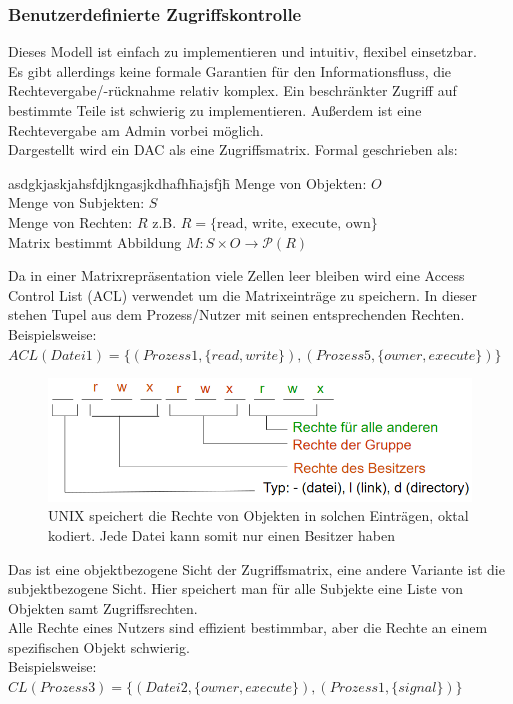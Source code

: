 \documentclass[a4paper,12pt,leqno]{article}
\begin{document}
\subsubsection{Benutzerdefinierte Zugriffskontrolle}
Dieses Modell ist einfach zu implementieren und intuitiv, flexibel einsetzbar.\\
Es gibt allerdings keine formale Garantien für den Informationsfluss, die Rechtevergabe/-rücknahme relativ komplex. Ein beschränkter Zugriff auf bestimmte Teile ist schwierig zu implementieren. Außerdem ist eine Rechtevergabe am Admin vorbei möglich.\\

Dargestellt wird ein DAC als eine Zugriffsmatrix. Formal geschrieben als:
\begin{tabbing}
asdgkjaskjahsfdjkngasjkdhafh\= hajsfjh\=\kill
Menge von Objekten: \> \>   $O$\\
Menge von Subjekten: \>   \>    $S$\\
Menge von Rechten: \>\>$R$ z.B. $R = \{\textrm{read, write, execute, own}\}$\\
Matrix bestimmt Abbildung \>\> $M: S\times O\rightarrow \mathcal{P}(R)$
\end{tabbing}
Da in einer Matrixrepräsentation viele Zellen leer bleiben wird eine Access Control List (ACL) verwendet um die Matrixeinträge zu speichern. In dieser stehen Tupel aus dem Prozess/Nutzer mit seinen entsprechenden Rechten.\\
Beispielsweise: $ACL(Datei1)=\{(Prozess1, \{read, write\}),(Prozess5,\{owner,execute\})\}$\\
\begin{figure}
\centering
\includegraphics[scale=0.7]{Grafiken/Unix-ACL.png}
\caption{UNIX speichert die Rechte von Objekten in solchen Einträgen, oktal kodiert. Jede Datei kann somit nur einen Besitzer haben}
\end{figure}
Das ist eine objektbezogene Sicht der Zugriffsmatrix, eine andere Variante ist die subjektbezogene Sicht. Hier speichert man für alle Subjekte eine Liste von Objekten samt Zugriffsrechten.\\
Alle Rechte eines Nutzers sind effizient bestimmbar, aber die Rechte an einem spezifischen Objekt schwierig.\\
Beispielsweise: $CL(Prozess3)=\{(Datei2,\{owner, execute\}), (Prozess1,\{signal\})\}$
\end{document}
